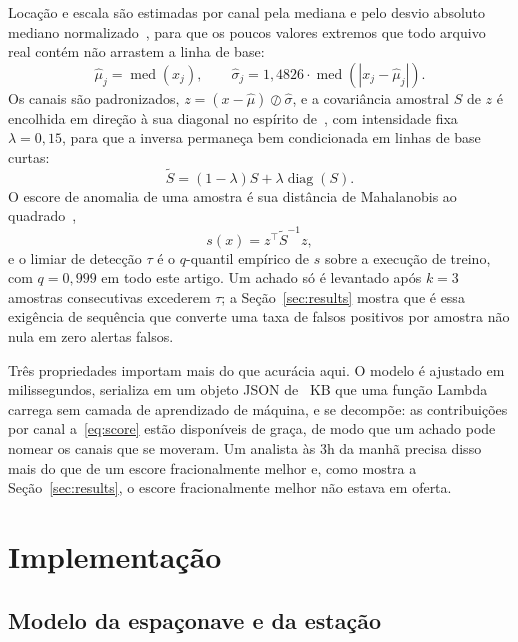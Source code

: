 \documentclass[conference]{IEEEtran}
\begin{document}
Locação e escala são estimadas por canal pela mediana e pelo desvio absoluto
mediano normalizado~\cite{rousseeuw1993mad}, para que os poucos valores
extremos que todo arquivo real contém não arrastem a linha de base:
\begin{equation}
\hat{\mu}_j = \operatorname{med}(x_j), \qquad
\hat{\sigma}_j = 1{,}4826 \cdot \operatorname{med}\!\left(|x_j - \hat{\mu}_j|\right).
\end{equation}
Os canais são padronizados, $z = (x - \hat{\mu}) \oslash \hat{\sigma}$, e a
covariância amostral $S$ de $z$ é encolhida em direção à sua diagonal no
espírito de~\cite{ledoit2004wellconditioned}, com intensidade fixa
$\lambda = 0{,}15$, para que a inversa permaneça bem condicionada em linhas de
base curtas:
\begin{equation}
\tilde{S} = (1 - \lambda) S + \lambda \operatorname{diag}(S).
\end{equation}
O escore de anomalia de uma amostra é sua distância de Mahalanobis ao
quadrado~\cite{mahalanobis1936},
\begin{equation}
s(x) = z^{\top} \tilde{S}^{-1} z,
\label{eq:score}
\end{equation}
e o limiar de detecção $\tau$ é o $q$-quantil empírico de $s$ sobre a execução
de treino, com $q = 0{,}999$ em todo este artigo. Um achado só é levantado após
$k = 3$ amostras consecutivas excederem $\tau$; a Seção~\ref{sec:results} mostra
que é essa exigência de sequência que converte uma taxa de falsos positivos por
amostra não nula em zero alertas falsos.

Três propriedades importam mais do que acurácia aqui. O modelo é ajustado em
milissegundos, serializa em um objeto JSON de \expModelKb~KB que uma função
Lambda carrega sem camada de aprendizado de máquina, e se decompõe: as
contribuições por canal a~\eqref{eq:score} estão disponíveis de graça, de modo
que um achado pode nomear os canais que se moveram. Um analista às 3h da manhã
precisa disso mais do que de um escore fracionalmente melhor e, como mostra a
Seção~\ref{sec:results}, o escore fracionalmente melhor não estava em oferta.

\section{Implementação}
\label{sec:impl}

\subsection{Modelo da espaçonave e da estação}
\end{document}

